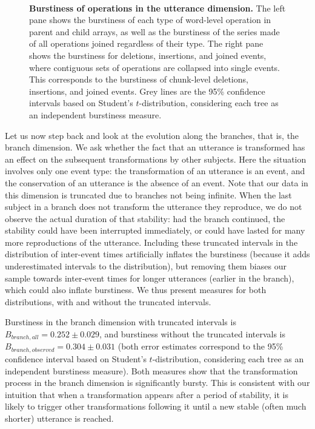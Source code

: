 \documentclass[a4paper,fleqn]{cas-dc}
\begin{document}
\begin{figure}
  \centering
  ~
  \caption[Burstiness of operations in the utterance dimension]{
  \textbf{Burstiness of operations in the utterance dimension.}
  The left pane shows the burstiness of each type of word-level operation in parent and child arrays, as well as the burstiness of the series made of all operations joined regardless of their type.
  The right pane shows the burstiness for deletions, insertions, and joined events, where contiguous sets of operations are collapsed into single events.
  This corresponds to the burstiness of chunk-level deletions, insertions, and joined events.
  Grey lines are the 95\% confidence intervals based on Student's $t$-distribution, considering each tree as an independent burstiness measure.
  }
  \label{fig:gistr-utterance-burstiness}
\end{figure}



Let us now step back and look at the evolution along the branches, that
is, the branch dimension. We ask whether the fact that an utterance is
transformed has an effect on the subsequent transformations by other
subjects. Here the situation involves only one event type: the
transformation of an utterance is an event, and the conservation of an
utterance is the absence of an event. Note that our data in this
dimension is truncated due to branches not being infinite. When the last
subject in a branch does not transform the utterance they reproduce, we
do not observe the actual duration of that stability: had the branch
continued, the stability could have been interrupted immediately, or
could have lasted for many more reproductions of the utterance.
Including these truncated intervals in the distribution of inter-event
times artificially inflates the burstiness (because it adds
underestimated intervals to the distribution), but removing them biases
our sample towards inter-event times for longer utterances (earlier in
the branch), which could also inflate burstiness. We thus present
measures for both distributions, with and without the truncated
intervals.

Burstiness in the branch dimension with truncated intervals is
\(B_{branch,all} = 0.252 \pm 0.029\), and burstiness without the
truncated intervals is \(B_{branch,observed} = 0.304 \pm 0.031\) (both
error estimates correspond to the 95\% confidence interval based on
Student's \(t\)-distribution, considering each tree as an independent
burstiness measure). Both measures show that the transformation process
in the branch dimension is significantly bursty. This is consistent with
our intuition that when a transformation appears after a period of
stability, it is likely to trigger other transformations following it
until a new stable (often much shorter) utterance is reached.
\end{document}
